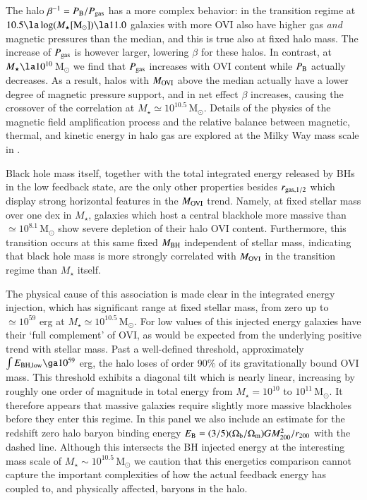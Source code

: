 \documentclass[useAMS,usenatbib]{mnras}
\newcommand{\msun}{\,M$_{\odot}$\xspace}
\newcommand{\ovi}{OVI\xspace}
\begin{document}
The halo $\beta^{-1} = P_{\rm B} / P_{\rm gas}$ has a more complex behavior: in the transition regime at \mbox{$10.5 \la \log(M_\star [\rm{M}_\odot]) \la 11.0$} galaxies with more \ovi also have higher gas \textit{and} magnetic pressures than the median, and this is true also at fixed halo mass. The increase of $P_{\rm gas}$ is however larger, lowering $\beta$ for these halos. In contrast, at $M_\star \la 10^{10}$\msun we find that $P_{\rm gas}$ increases with \ovi content while $P_{\rm B}$ actually decreases. As a result, halos with $M_{\rm OVI}$ above the median actually have a lower degree of magnetic pressure support, and in net effect $\beta$ increases, causing the crossover of the correlation at $M_\star \simeq 10^{10.5}$\msun. Details of the physics of the magnetic field amplification process and the relative balance between magnetic, thermal, and kinetic energy in halo gas are explored at the Milky Way mass scale in \cite{pakmor17}.

Black hole mass itself, together with the total integrated energy released by BHs in the low feedback state, are the only other properties besides $r_{\rm gas,1/2}$ which display strong horizontal features in the $M_{\rm OVI}$ trend. Namely, at fixed stellar mass over one dex in $M_\star$, galaxies which host a central blackhole more massive than $\simeq 10^{8.1}$\msun show severe depletion of their halo \ovi content. Furthermore, this transition occurs at this same fixed $M_{\rm BH}$ independent of stellar mass, indicating that black hole mass is more strongly correlated with $M_{\rm OVI}$ in the transition regime than $M_\star$ itself.

The physical cause of this association is made clear in the integrated energy injection, which has significant range at fixed stellar mass, from zero up to $\simeq 10^{59}$ erg at $M_\star \simeq 10^{10.5}$\msun. For low values of this injected energy galaxies have their `full complement' of \ovi, as would be expected from the underlying positive trend with stellar mass. Past a well-defined threshold, approximately $\int E_{\rm BH,low} \ga 10^{59}$ erg, the halo loses of order 90\% of its gravitationally bound \ovi mass. This threshold exhibits a diagonal tilt which is nearly linear, increasing by roughly one order of magnitude in total energy from $M_\star = 10^{10}$ to $10^{11}$\msun. It therefore appears that massive galaxies require slightly more massive blackholes before they enter this regime. In this panel we also include an estimate for the redshift zero halo baryon binding energy $E_{\rm B} = (3/5)(\Omega_{\rm b}/\Omega_{\rm m})GM_{\rm 200}^2 / r_{\rm 200}$ with the dashed line. Although this intersects the BH injected energy at the interesting mass scale of $M_\star \sim 10^{10.5}$\msun we caution that this energetics comparison cannot capture the important complexities of how the actual feedback energy has coupled to, and physically affected, baryons in the halo.
\end{document}
